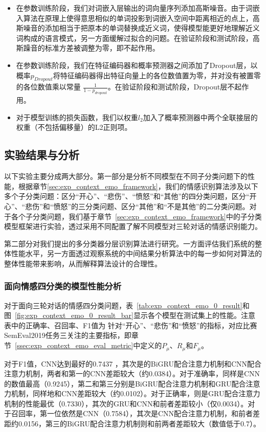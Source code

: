 \begin{itemize}
\item 在参数训练阶段，我们对词嵌入层输出的词向量序列添加高斯噪音。由于词嵌入算法在原理上使得意思相似的单词投影到词嵌入空间中距离相近的点上，高斯噪音的添加相当于把原本的单词替换成近义词，使得模型能更好地理解近义词构成的语言模式，另一方面缓解过拟合的问题。在验证阶段和测试阶段，高斯躁音的标准方差被调整为零，即不起作用。

\item 在参数训练阶段，我们在特征编码器和概率预测器之间添加了Dropout层，以概率$p_{Dropout}$将特征编码器得出特征向量上的各位数值置为零，并对没有被置零的各位数值乘以常量 $\frac{1}{1-p_{dropout}}$。在验证阶段和测试阶段，Dropout层不起作用。

\item 对于模型训练的损失函数，我们以权重$l_2$加入了概率预测器中两个全联接层的权重（不包括偏移量）的L2正则项。

\end{itemize}

\subsection{实验结果与分析}

以下实验主要分成两大部分。第一部分是分析不同模型在不同子分类问题下的性能，根据章节\ref{sec:exp_context_emo_framework}，我们的情感识别算法涉及以下多个子分类问题：区分“开心”、“悲伤”、“愤怒”和“其他”的四分类问题，区分“开心”、“悲伤”和“愤怒”的三分类问题、区分“其他”和“不是其他”的二分类问题。对于各个子分类问题，我们基于章节~\ref{sec:exp_context_emo_framework}中的子分类模型框架进行实验，透过采用不同配置了解不同模型对三轮对话的情感识别能力。

第二部分对我们提出的多分类器分层识别算法进行研究。一方面评估我们系统的整体性能水平，另一方面透过观察系统的中间结果分析算法中的每一步如何对算法的整体性能带来影响，从而解释算法设计的合理性。

\subsubsection{面向情感四分类的模型性能分析}
\label{sssec:exp_context_emo_0_base}

对于面向三轮对话的情感四分类问题，表~\ref{tab:exp_context_emo_0_result}和图~\ref{fig:exp_context_emo_0_result_bar}显示各个模型在测试集上的性能。注意表中的正确率、召回率、F1值为
针对“开心”、“悲伤”和“愤怒”的指标，对应比赛SemEval2019任务三关注的主要指标，即章节~\ref{ssec:exp_context_emo_eval_metric}中定义的$P_\mu$、$R_\mu$和$F_\mu$。

对于F1值，CNN达到最好的0.7437 ，其次是的BiGRU配合注意力机制和CNN配合注意力机制，两者和第一的CNN差距较大（约0.0384）。对于准确率，同样是CNN的数值最高（0.9245），第二和第三分别是BiGRU配合注意力机制和GRU配合注意力机制，同样地和CNN差距较大（约0.0102）。对于正确率，则是GRU配合注意力机制的性能最优（0.7330），其次的GRU和CNN和前者差距较小（仅0.0034）。对于召回率，第一位依然是CNN（0.7584），其次是CNN配合注意力机制，和前者差距约0.0156，第三的BiGRU配合注意力机制则和前两者差距较大（数值低于0.7）。

